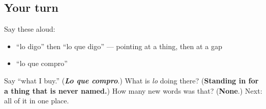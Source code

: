 \subsection*{Your turn}
Say these aloud:

\begin{itemize}
\raggedright
  \item \textquotedblleft{}lo digo\textquotedblright{} then \textquotedblleft{}lo que digo\textquotedblright{} — pointing at a thing, then at a gap
  \item \textquotedblleft{}lo que compro\textquotedblright{}
\end{itemize}

\begin{tcolorbox}[breakable,colback=teal!4,colframe=teal!35!black,title={Before you move on}]
Say \textquotedblleft{}what I buy.\textquotedblright{} (\emph{\textbf{Lo que compro}}.) What is \emph{lo} doing there? (\textbf{Standing in for a thing that is never named.}) How many new words was that? (\textbf{None}.) Next: all of it in one place.
\end{tcolorbox}
